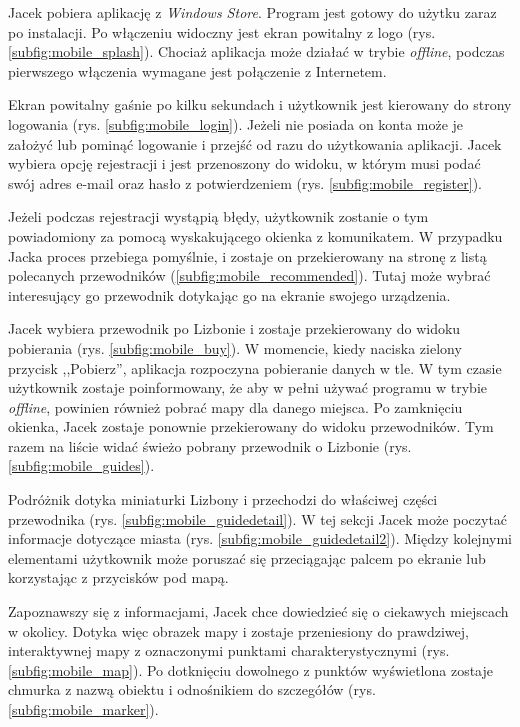 \documentclass[a4paper]{book}
\begin{document}
		Jacek pobiera aplikację z \emph{Windows Store}. Program jest gotowy do użytku zaraz po instalacji. Po włączeniu widoczny jest ekran powitalny z logo (rys.\ref{subfig:mobile_splash}). Chociaż aplikacja może działać w trybie \emph{offline}, podczas pierwszego włączenia wymagane jest połączenie z Internetem. 
		
		Ekran powitalny gaśnie po kilku sekundach i użytkownik jest kierowany do strony logowania (rys. \ref{subfig:mobile_login}). Jeżeli nie posiada on konta może je założyć lub pominąć logowanie i przejść od razu do użytkowania aplikacji. Jacek wybiera opcję rejestracji i jest przenoszony do widoku, w którym musi podać swój adres e-mail oraz hasło z potwierdzeniem (rys. \ref{subfig:mobile_register}). 
		
		Jeżeli podczas rejestracji wystąpią błędy, użytkownik zostanie o tym powiadomiony za pomocą wyskakującego okienka z komunikatem. W przypadku Jacka proces przebiega pomyślnie, i zostaje on przekierowany na stronę z listą polecanych przewodników (\ref{subfig:mobile_recommended}). Tutaj może wybrać interesujący go przewodnik dotykając go na ekranie swojego urządzenia.
		
		Jacek wybiera przewodnik po Lizbonie i zostaje przekierowany do widoku pobierania (rys. \ref{subfig:mobile_buy}). W momencie, kiedy naciska zielony przycisk ,,Pobierz'', aplikacja rozpoczyna pobieranie danych w tle. W tym czasie użytkownik zostaje poinformowany, że aby w pełni używać programu w trybie \emph{offline}, powinien również pobrać mapy dla danego miejsca. Po zamknięciu okienka, Jacek zostaje ponownie przekierowany do widoku przewodników. Tym razem na liście widać świeżo pobrany przewodnik o Lizbonie (rys. \ref{subfig:mobile_guides}). 
		
		Podróżnik dotyka miniaturki Lizbony i przechodzi do właściwej części przewodnika (rys. \ref{subfig:mobile_guidedetail}). W tej sekcji Jacek może poczytać informacje dotyczące miasta (rys. \ref{subfig:mobile_guidedetail2}). Między kolejnymi elementami użytkownik może poruszać się przeciągając palcem po ekranie lub korzystając z przycisków pod mapą. 
		
		Zapoznawszy się z informacjami, Jacek chce dowiedzieć się o ciekawych miejscach w okolicy. Dotyka więc obrazek mapy i zostaje przeniesiony do prawdziwej, interaktywnej mapy z oznaczonymi punktami charakterystycznymi (rys. \ref{subfig:mobile_map}). Po dotknięciu dowolnego z punktów wyświetlona zostaje chmurka z nazwą obiektu i odnośnikiem do szczegółów (rys. \ref{subfig:mobile_marker}). 
		
\end{document}

